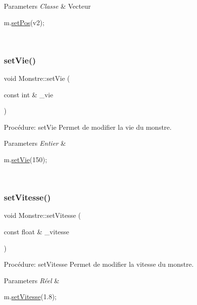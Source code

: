 \begin{DoxyParams}{Parameters}
{\em Classe} & Vecteur 
\begin{DoxyCode}
m.\hyperlink{classMonstre_ac1ba6618f2a485ea20a448dbbddbf368}{setPos}(v2);
\end{DoxyCode}
 \\
\hline
\end{DoxyParams}
\mbox{\label{classMonstre_ad26a170300007ea8c78348a29123de5c}} 
\subsubsection{\texorpdfstring{set\+Vie()}{setVie()}}
{\footnotesize\ttfamily void Monstre\+::set\+Vie (\begin{DoxyParamCaption}\item[{const int \&}]{\+\_\+vie }\end{DoxyParamCaption})}



Procédure\+: set\+Vie Permet de modifier la vie du monstre. 


\begin{DoxyParams}{Parameters}
{\em Entier} & 
\begin{DoxyCode}
m.\hyperlink{classMonstre_ad26a170300007ea8c78348a29123de5c}{setVie}(150);
\end{DoxyCode}
 \\
\hline
\end{DoxyParams}
\mbox{\label{classMonstre_a900cdfe95acf91d17bcf8b33e2b59a97}} 
\subsubsection{\texorpdfstring{set\+Vitesse()}{setVitesse()}}
{\footnotesize\ttfamily void Monstre\+::set\+Vitesse (\begin{DoxyParamCaption}\item[{const float \&}]{\+\_\+vitesse }\end{DoxyParamCaption})}



Procédure\+: set\+Vitesse Permet de modifier la vitesse du monstre. 


\begin{DoxyParams}{Parameters}
{\em Réel} & 
\begin{DoxyCode}
m.\hyperlink{classMonstre_a900cdfe95acf91d17bcf8b33e2b59a97}{setVitesse}(1.8);
\end{DoxyCode}
 \\
\hline
\end{DoxyParams}
\mbox{\label{classMonstre_a26db17b29af1a99278e7d21bc91f1532}} 
